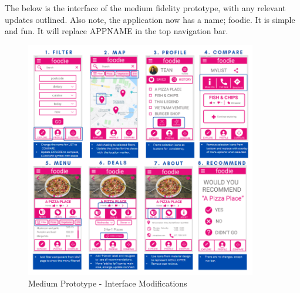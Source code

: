 \documentclass[a4 paper, 12pt]{article}
\begin{document}
        The below is the interface of the medium fidelity prototype, with any relevant updates outlined. Also note, the application now has a name; foodie. It is simple and fun. It will replace APPNAME in the top navigation bar. 
            \begin{figure} [H]
                \centering
                \includegraphics[width=0.9\textwidth, frame]
                    {./Med_Fidelity/Med_Report/images/med_proto_notes.PNG}  
                \caption{Medium Prototype - Interface Modifications}
            \end{figure}   
        
\end{document}

